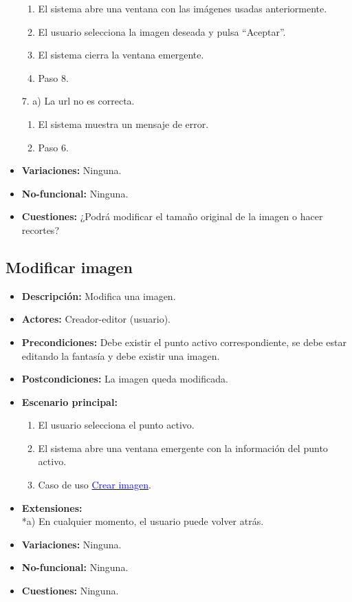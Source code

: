 \documentclass[12pt,letterpaper]{article}
\begin{document}
\begin{itemize}
	\begin{enumerate}
		\item El sistema abre una ventana con las imágenes usadas anteriormente.
		\item El usuario selecciona la imagen deseada y pulsa ``Aceptar''.
		\item El sistema cierra la ventana emergente.
		\item Paso 8.
	\end{enumerate}
	7. a) La url no es correcta.
	\begin{enumerate}
		\item El sistema muestra un mensaje de error.
		\item Paso 6.
	\end{enumerate}
	\item \textbf{Variaciones:} Ninguna.
	\item \textbf{No-funcional:} Ninguna.
	\item \textbf{Cuestiones:} ¿Podrá modificar el tamaño original de la imagen o hacer recortes?
\end{itemize}

\subsection{Modificar imagen}
\begin{itemize}
	\item \textbf{Descripción:} Modifica una imagen.
	\item \textbf{Actores:} Creador-editor (usuario).
	\item \textbf{Precondiciones:} Debe existir el punto activo correspondiente, se debe estar editando la fantasía y debe existir una imagen.
	\item \textbf{Postcondiciones:} La imagen queda modificada.
	\item \textbf{Escenario principal:}
	\begin{enumerate}
		\item El usuario selecciona el punto activo.
		\item El sistema abre una ventana emergente con la información del punto activo.
		\item Caso de uso \hyperlink{crearimagen}{\textcolor{blue}{Crear imagen}}.
	\end{enumerate}
	\item \textbf{Extensiones:} \\ *a) En cualquier momento, el usuario puede volver atrás.
	\item \textbf{Variaciones:} Ninguna.
	\item \textbf{No-funcional:} Ninguna.
	\item \textbf{Cuestiones:} Ninguna.
\end{itemize}
\end{document}
